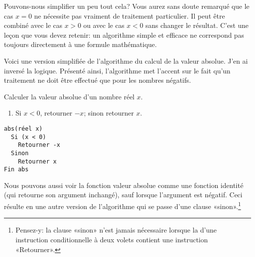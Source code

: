 Pouvons-nous simplifier un peu tout cela? Vous aurez sans doute
remarqué que le cas $x = 0$ ne nécessite pas vraiment de traitement
particulier. Il peut être combiné avec le cas $x > 0$ ou avec le cas
$x < 0$ sans changer le résultat. C'est une leçon que vous devez
retenir: un algorithme simple et efficace ne correspond pas toujours
directement à une formule mathématique.

Voici une version simplifiée de l'algorithme du calcul de la valeur
absolue. J'en ai inversé la logique. Présenté ainsi, l'algorithme met
l'accent sur le fait qu'un traitement ne doit être effectué que pour
les nombres négatifs.

\begin{algorithmebis}
  \label{algo:algorithmes:abs:simplifie}
  Calculer la valeur absolue d'un nombre réel $x$.

  \noindent
  \begin{minipage}[t]{0.48\linewidth}
    \begin{enumerate}
    \item Si $x < 0$, retourner $-x$; sinon retourner $x$.
    \end{enumerate}
  \end{minipage}
  \hfill
  \begin{minipage}[t]{0.48\linewidth}
    \begin{Schunk}
\begin{Verbatim}
abs(réel x)
  Si (x < 0)
    Retourner -x
  Sinon
    Retourner x
Fin abs
\end{Verbatim}
    \end{Schunk}
  \end{minipage}
\end{algorithmebis}

Nous pouvons aussi voir la fonction valeur absolue comme une fonction
identité (qui retourne son argument inchangé), sauf lorsque l'argument
est négatif. Ceci résulte en une autre version de l'algorithme qui se
passe d'une clause «sinon».\footnote{%
  Pensez-y: la clause «sinon» n'est jamais nécessaire lorsque la
   d'une instruction conditionnelle à deux volets
  contient une instruction «Retourner».}

